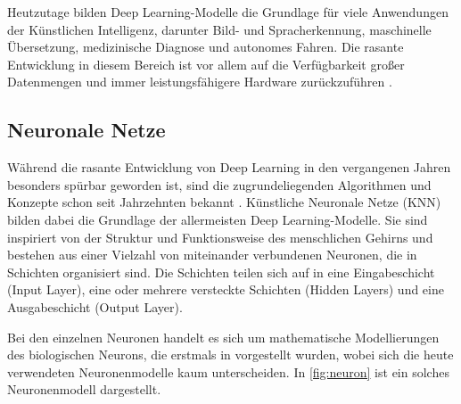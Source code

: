 Heutzutage bilden Deep Learning-Modelle die Grundlage für viele Anwendungen der Künstlichen Intelligenz, darunter Bild- und Spracherkennung, maschinelle Übersetzung, medizinische Diagnose und autonomes Fahren. Die rasante Entwicklung in diesem Bereich ist vor allem auf die Verfügbarkeit großer Datenmengen und immer leistungsfähigere Hardware zurückzuführen \parencite{Goodfellow2016deeplearning}.

\subsection{Neuronale Netze} \label{subsec:neural-networks}

Während die rasante Entwicklung von Deep Learning in den vergangenen Jahren besonders spürbar geworden ist, sind die zugrundeliegenden Algorithmen und Konzepte schon seit Jahrzehnten bekannt \parencite{Goodfellow2016deeplearning}. Künstliche Neuronale Netze (KNN) bilden dabei die Grundlage der allermeisten Deep Learning-Modelle. Sie sind inspiriert von der Struktur und Funktionsweise des menschlichen Gehirns und bestehen aus einer Vielzahl von miteinander verbundenen Neuronen, die in Schichten organisiert sind. Die Schichten teilen sich auf in eine Eingabeschicht (Input Layer), eine oder mehrere versteckte Schichten (Hidden Layers) und eine Ausgabeschicht (Output Layer).


Bei den einzelnen Neuronen handelt es sich um mathematische Modellierungen des biologischen Neurons, die erstmals in \parencite{McCulloch1943nn} vorgestellt wurden, wobei sich die heute verwendeten Neuronenmodelle kaum unterscheiden. In \autoref{fig:neuron} ist ein solches Neuronenmodell dargestellt.

